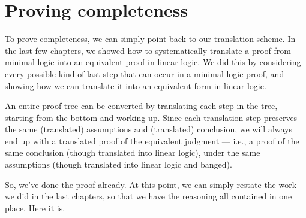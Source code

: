 \documentclass[../../../main.tex]{subfiles}
\begin{document}
\section{Proving completeness}

To prove completeness, we can simply point back to our translation scheme. In the last few chapters, we showed how to systematically translate a proof from minimal logic into an equivalent proof in linear logic. We did this by considering every possible kind of last step that can occur in a minimal logic proof, and showing how we can translate it into an equivalent form in linear logic.

An entire proof tree can be converted by translating each step in the tree, starting from the bottom and working up. Since each translation step preserves the same (translated) assumptions and (translated) conclusion, we will always end up with a translated proof of the equivalent judgment --- i.e., a proof of the same conclusion (though translated into linear logic), under the same assumptions (though translated into linear logic and banged).  

So, we've done the proof already. At this point, we can simply restate the work we did in the last chapters, so that we have the reasoning all contained in one place. Here it is.
\end{document}
